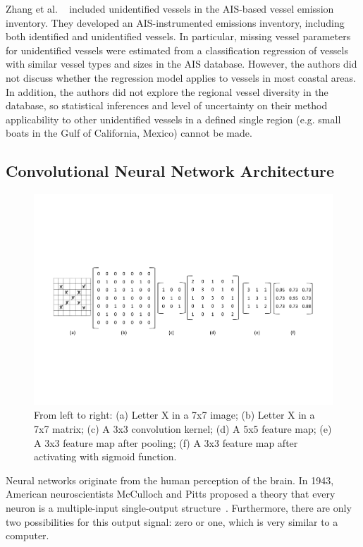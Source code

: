 Zhang et al. ~\cite{Zhang2019TheSO} included unidentified vessels in the AIS-based vessel emission inventory. They developed an AIS-instrumented emissions inventory, including both identified and unidentified vessels. In particular, missing vessel parameters for unidentified vessels were estimated from a classification regression of vessels with similar vessel types and sizes in the AIS database. However, the authors did not discuss whether the regression model applies to vessels in most coastal areas. In addition, the authors did not explore the regional vessel diversity in the database, so statistical inferences and level of uncertainty on their method applicability to other unidentified vessels in a defined single region (e.g. small boats in the Gulf of California, Mexico) cannot be made.

\subsection{Convolutional Neural Network Architecture}
\begin{figure}[!t]
    \centering
    \includegraphics[width=7in]{img/X.pdf}
    \caption{From left to right: (a) Letter X in a 7x7 image; (b) Letter X in a 7x7 matrix; (c) A 3x3 convolution kernel; (d) A 5x5 feature map; (e) A 3x3 feature map after pooling; (f) A 3x3 feature map after activating with sigmoid function.}
    \label{X}
\end{figure}




Neural networks originate from the human perception of the brain. In 1943, American neuroscientists McCulloch and Pitts proposed a theory that every neuron is a multiple-input single-output structure~\cite{mcculloch1943logical}. Furthermore, there are only two possibilities for this output signal: zero or one, which is very similar to a computer.

